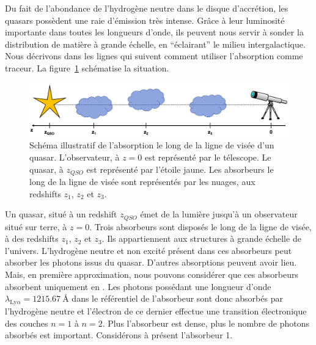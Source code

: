 \documentclass[11pt, twoside, a4paper, openright]{report}
\begin{document}
Du fait de l'abondance de l'hydrogène neutre dans le disque d'accrétion, les quasars possèdent une raie d'émission \lya{} très intense. Grâce à leur luminosité importante dans toutes les longueurs d'onde, ils peuvent nous servir à sonder la distribution de matière à grande échelle, en ``éclairant'' le milieu intergalactique.
Nous décrivons dans les lignes qui suivent comment utiliser l'absorption \lya{} comme traceur.
La figure~\ref{fig:schema_lya} schématise la situation.
\begin{figure}
  \centering
  \includegraphics[scale=0.4]{schema_lya}
  \caption{Schéma illustratif de l'absorption le long de la ligne de visée d'un quasar. L'observateur, à $z=0$ est représenté par le télescope. Le quasar, à $z_{QSO}$ est représenté par l'étoile jaune. Les absorbeurs le long de la ligne de visée sont représentés par les nuages, aux redshifts $z_{1}$, $z_{2}$ et $z_{3}$.}
  \label{fig:schema_lya}
\end{figure}
Un quasar, situé à un redshift $z_{QSO}$ émet de la lumière jusqu'à un observateur situé sur terre, à $z=0$. Trois absorbeurs sont disposés le long de la ligne de visée, à des redshifts $z_1$, $z_2$ et $z_3$. Ils appartiennent aux structures à grande échelle de l'univers. L'hydrogène neutre et non excité présent dans ces absorbeurs peut absorber les photons issus du quasar.
D'autres absorptions peuvent avoir lieu. Mais, en première approximation, nous pouvons considérer que ces absorbeurs absorbent uniquement en \lya{}.
Les photons possédant une longueur d'onde $\lambda_{\mathrm{Ly}\alpha} = \SI{1215.67}{\angstrom}$ dans le référentiel de l'absorbeur sont donc absorbés par l'hydrogène neutre et l'électron de ce dernier effectue une transition électronique des couches $n=1$ à $n=2$. Plus l'absorbeur est dense, plus le nombre de photons absorbés est important. Considérons à présent l'absorbeur 1.
\end{document}

